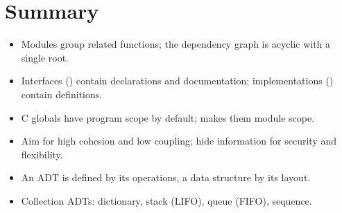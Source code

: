 \section{Summary}
\begin{itemize}
  \item Modules group related functions; the dependency graph is acyclic with a single root.
  \item Interfaces () contain declarations and documentation; implementations
    () contain definitions.
  \item C globals have program scope by default;  makes them module scope.
  \item Aim for high cohesion and low coupling; hide information for security and flexibility.
  \item An ADT is defined by its operations, a data structure by its layout.
  \item Collection ADTs: dictionary, stack (LIFO), queue (FIFO), sequence.
\end{itemize}
